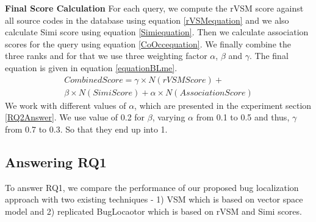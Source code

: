 \documentclass[conference]{IEEEtran}
\begin{document}
\textbf{Final Score Calculation}
For each query, we compute the rVSM score against all source codes in the database using equation \ref{rVSMequation} and we also calculate Simi score using equation \ref{Simiequation}. Then we calculate association scores for the query using equation \ref{CoOccequation}.
We finally combine the three ranks and for that we use three weighting factor {$\alpha$}, $\beta$ and $\gamma$.
The final equation is given in equation \ref{equationBLme}.
\begin{multline}\label{equationBLme}
CombinedScore=\gamma \times N(rVSMScore)+
\\ \beta \times N(SimiScore) + \alpha \times N(AssociationScore)
\end{multline}
We work with different values of $\alpha$, which are presented in the experiment section \ref{RQ2Answer}. We use value of 0.2 for $\beta$, varying $\alpha$ from 0.1 to 0.5 and thus, $\gamma$ from 0.7 to 0.3. So that they end up into 1.
\subsection{Answering RQ1} \label{RQ1answer}
To answer RQ1, we compare the performance of our proposed bug localization approach with two existing techniques - 1) VSM which is based on vector space model and 2) replicated BugLocaotor \cite{Jian} which is based on rVSM and Simi scores. 
\end{document}
